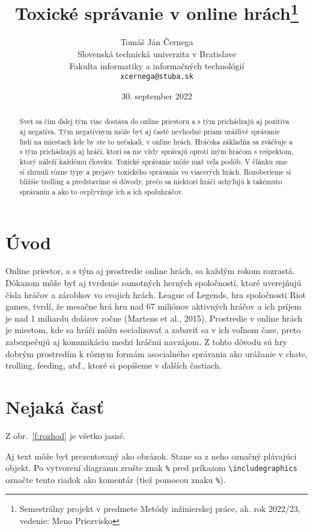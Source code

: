 \documentclass[10pt,twoside,slovak,a4paper]{article}
\title{Toxické správanie v online hrách\thanks{Semestrálny projekt v predmete Metódy inžinierskej práce, ak. rok 2022/23, vedenie: Meno Priezvisko}} %
\author{Tomáš Ján Černega\\[2pt]
	{\small Slovenská technická univerzita v Bratislave}\\
	{\small Fakulta informatiky a informačných technológií}\\
	{\small \texttt{xcernega@stuba.sk}}
	}
\date{\small 30. september 2022} %
\begin{document}
\maketitle

\begin{abstract}
Svet sa čím ďalej tým viac dostáva do online priestoru a s tým prichádzajú aj pozitíva aj negatíva. Tým negatívnym môže byť aj časté nevhodné priam urážlivé správanie ľudí na miestach kde by ste to nečakali, v online hrách.
 Hráčska základňa sa zväčšuje a s tým prichádzajú aj hráči, ktorí sa nie vždy správajú oproti iným hráčom s rešpektom, ktorý náleží každému človeku.
 Toxické správanie môže mať veľa podôb. V článku sme si zhrnuli rôzne typy a prejavy toxického správania vo viacerých hrách.
 Rozoberieme si bližšie trolling a predstavíme si dôvody, prečo sa niektorí hráči uchyľujú k takémuto správaniu a ako to ovplyvňuje ich a ich spoluhráčov. 
\end{abstract}



\section{Úvod}
Online priestor, a s tým aj prostredie online hrách,  sa každým rokom rozrastá. Dôkazom môže byť aj tvrdenie samotných herných spoločností, ktoré uverejňujú čísla hráčov a zárobkov vo svojich hrách.  
League of Legends, hra spoločnosti Riot games, tvrdí, že mesačne hrá hru nad 67 miliónov aktivných hráčov a ich príjem je nad 1 miliardu dolárov ročne (Martens et al., 2015). 
Prostredie v online hrách je miestom, kde sa hráči môžu socializovať a zabaviť sa v ich voľnom čase, preto zabezpečujú aj komunikáciu medzi hráčmi navzájom. 
Z tohto dôvodu sú hry dobrým prostredím k rôznym formám asocialného správania ako urážanie v chate, trolling, feeding, atď., ktoré si popíšeme v ďalších častiach. 


\section{Nejaká časť} \label{nejaka}

Z obr.~\ref{f:rozhod} je všetko jasné. 

\begin{figure*}[tbh]
\centering
Aj text môže byť prezentovaný ako obrázok. Stane sa z neho označný plávajúci objekt. Po vytvorení diagramu zrušte znak \texttt{\%} pred príkazom \verb|\includegraphics| označte tento riadok ako komentár (tiež pomocou znaku \texttt{\%}).
\caption{Rozhodujúci argument.}
\label{f:rozhod}
\end{figure*}
\end{document}

